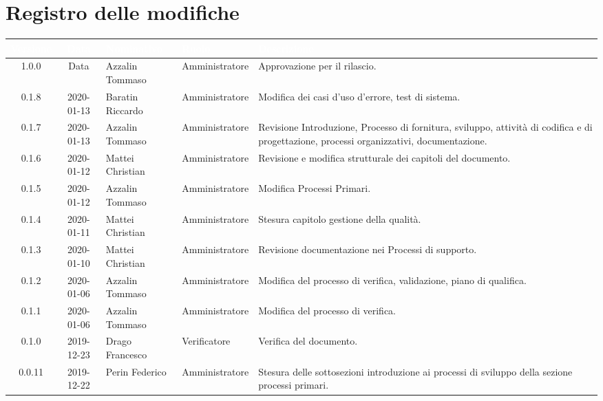 \section*{Registro delle modifiche}
{
\renewcommand{\arraystretch}{1.5}
\centering
\begin{longtable}{c c  C{4cm}  C{3cm} C{4cm}}
\textcolor{white}{\textbf{Versione}} & \textcolor{white}{\textbf{Data}} & \textcolor{white}{\textbf{Nominativo}} & \textcolor{white}{\textbf{Ruolo}} & \textcolor{white}{\textbf{Descrizione}}\\	
\endhead


1.0.0 & Data & Azzalin Tommaso & Amministratore & Approvazione per il rilascio.  \\

0.1.8 & 2020-01-13 & Baratin Riccardo & Amministratore & Modifica dei casi d'uso d'errore, test di sistema. \\

0.1.7 & 2020-01-13 & Azzalin Tommaso & Amministratore & Revisione Introduzione, Processo di fornitura, sviluppo, attività di codifica e di progettazione, processi organizzativi, documentazione. \\

0.1.6 & 2020-01-12 & Mattei Christian & Amministratore & Revisione e modifica strutturale dei capitoli del documento. \\

0.1.5 & 2020-01-12 & Azzalin Tommaso & Amministratore & Modifica Processi Primari. \\

0.1.4 & 2020-01-11 & Mattei Christian & Amministratore & Stesura capitolo gestione della qualità. \\

0.1.3 & 2020-01-10 & Mattei Christian & Amministratore & Revisione documentazione nei Processi di supporto. \\

0.1.2 & 2020-01-06 & Azzalin Tommaso & Amministratore & Modifica del processo di verifica, validazione, piano di qualifica. \\

0.1.1 & 2020-01-06 & Azzalin Tommaso & Amministratore & Modifica del processo di verifica. \\

0.1.0 & 2019-12-23 & Drago Francesco & Verificatore & Verifica del documento. \\

0.0.11 & 2019-12-22 & Perin Federico & Amministratore & Stesura delle sottosezioni introduzione ai processi di sviluppo della sezione processi primari. \\


\end{longtable}}
